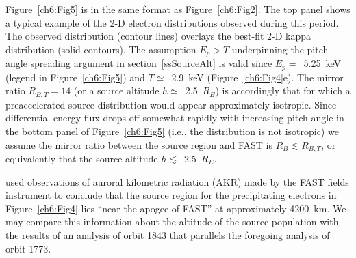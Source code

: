   Figure~\ref{ch6:Fig5} is in the same format as Figure~\ref{ch6:Fig2}. The top
  panel shows a typical example of the 2-D electron distributions observed
  during this period. The observed distribution (contour lines) overlays the
  best-fit 2-D kappa distribution (solid contours). The assumption $E_p > T$
  underpinning the pitch-angle spreading argument in section~\ref{ssSourceAlt}
  is valid since $E_p =$~5.25~keV (legend in Figure~\ref{ch6:Fig5}) and
  $T \simeq$~2.9~keV (Figure~\ref{ch6:Fig4}e). The mirror ratio $R_{B,T} = 14$
  (or a source altitude $h \simeq$~2.5~$R_E$) is accordingly that for which a
  preaccelerated source distribution would appear approximately isotropic. Since
  differential energy flux drops off somewhat rapidly with increasing pitch
  angle in the bottom panel of Figure~\ref{ch6:Fig5} (i.e., the distribution is
  not isotropic) we assume the mirror ratio between the source region and FAST
  is $R_B \lesssim R_{B,T}$, or equivalently that the source altitude
  $h \lesssim$~2.5~$R_E$.

  \citet{Ergun1998} used observations of auroral kilometric radiation (AKR) made
  by the FAST fields instrument \citep{Ergun2001} to conclude that the source
  region for the precipitating electrons in Figure~\ref{ch6:Fig4} lies ``near
  the apogee of FAST'' at approximately 4200~km. We may compare this information
  about the altitude of the source population with the results of an analysis of
  orbit 1843 that parallels the foregoing analysis of orbit 1773.


